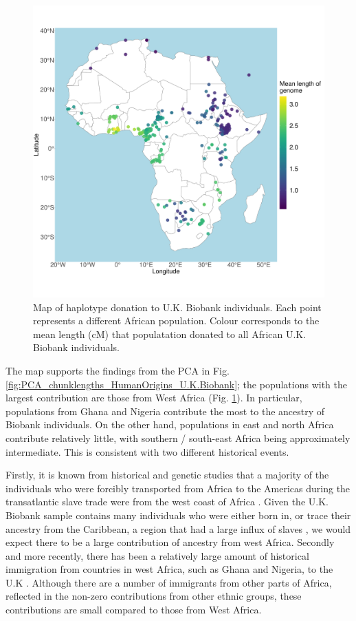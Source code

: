 \begin{figure}[htp]
    \centering
    \includegraphics[width=1.0\textwidth]{../images/chapter3/haplotype_sharing_map.pdf}
    \caption{Map of haplotype donation to U.K. Biobank individuals. Each point represents a different African population. Colour corresponds to the mean length (cM) that populatation donated to all African U.K. Biobank individuals.}
    \label{fig:haplotype_sharing_map_zoomed_II}
\end{figure}

The map supports the findings from the PCA in Fig. \ref{fig:PCA_chunklengths_HumanOrigins_U.K.Biobank}; the populations with the largest contribution are those from West Africa (Fig. \ref{fig:haplotype_sharing_map_zoomed_II}). In particular, populations from Ghana and Nigeria contribute the most to the ancestry of Biobank individuals. On the other hand, populations in east and north Africa contribute relatively little, with southern / south-east Africa being approximately intermediate. This is consistent with two different historical events. 

Firstly, it is known from historical and genetic studies that a majority of the individuals who were forcibly transported from Africa to the Americas during the transatlantic slave trade were from the west coast of Africa \cite{micheletti2020genetic}. Given the U.K. Biobank sample contains many individuals who were either born in, or trace their ancestry from the Caribbean, a region that had a large influx of slaves \cite{rawley2005transatlantic}, we would expect there to be a large contribution of ancestry from west Africa. Secondly and more recently, there has been a relatively large amount of historical immigration from countries in west Africa, such as Ghana and Nigeria, to the U.K \cite{banton1953recent}. Although there are a number of immigrants from other parts of Africa, reflected in the non-zero contributions from other ethnic groups, these contributions are small compared to those from West Africa.

